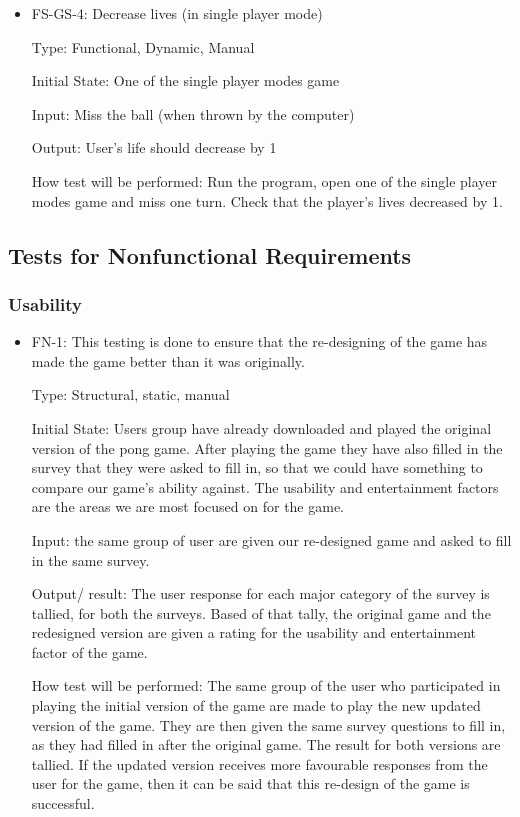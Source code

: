 \documentclass[12pt,letterpaper]{article}
\begin{document}
\begin{reqbox}
	\begin{itemize}
	\item FS-GS-4: Decrease lives (in single player mode)

	Type: Functional, Dynamic, Manual

	Initial State: One of the single player modes game 

	Input: Miss the ball (when thrown by the computer)

	Output: User’s life should decrease by 1

	How test will be performed: Run the program, open one of the single player modes game and miss one turn. Check that the player’s lives decreased by 1.
	\end{itemize}
\end{reqbox}

	\subsection{Tests for Nonfunctional Requirements}
	\subsubsection{Usability}
\begin{reqbox}
	\begin{itemize}
	\item FN-1: This testing is done to ensure that the re-designing of the game has made the game better than it was originally.

	Type: Structural, static, manual

	Initial State: Users group have already downloaded and played the original version of the pong game. After playing the game they have also filled in the survey that they were asked to fill in, so that we could have something to compare our game’s ability against. The usability and entertainment factors are the areas we are most focused on for the game.

	Input: the same group of user are given our re-designed game and asked to fill in the same survey.

	Output/ result: The user response for each major category of the survey is tallied, for both the surveys. Based of that tally, the original game and the redesigned version are given a rating for the usability and entertainment factor of the game. 

	How test will be performed: The same group of the user who participated in playing the initial version of the game are made to play the new updated version of the game. They are then given the same survey questions to fill in, as they had filled in after the original game. The result for both versions are tallied. If the updated version receives more favourable responses from the user for the game, then it can be said that this re-design of the game is successful.  
	\end{itemize}
\end{reqbox}
\end{document}
